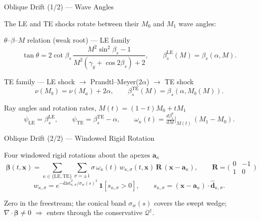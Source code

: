\documentclass[aspectratio=169]{beamer}
\newcommand{\xv}{\mathbf{x}}
\newcommand{\av}{\mathbf{a}}
\newcommand{\dhat}{\mathbf{\hat{d}}}
\newcommand{\R}{\mathbf{R}}
\newcommand{\dive}{\nabla\!\cdot}
\newcommand{\Qcal}{\mathcal{Q}}
\begin{document}
\begin{frame}{Oblique Drift (1/2) — Wave Angles}

The LE and TE shocks rotate between their $M_0$ and $M_1$ wave angles:

\begin{block}{$\theta$--$\beta$--$M$ relation (weak root) — LE family}
\[
    \tan\theta = 2\cot\beta_s\,\frac{M^2\sin^2\beta_s - 1}{M^2(\gamma_g+\cos2\beta_s)+2},
    \qquad
    \beta_s^{\mathrm{LE}}(M) = \beta_s(\alpha, M).
\]
\end{block}

\begin{block}{TE family — LE shock $\to$ Prandtl--Meyer($2\alpha$) $\to$ TE shock}
\[
    \nu(M_b) = \nu(M_a) + 2\alpha,
    \qquad
    \beta_s^{\mathrm{TE}}(M) = \beta_s(\alpha, M_b(M)).
\]
\end{block}

\begin{block}{Ray angles and rotation rates,\; $M(t)=(1-t)M_0+tM_1$}
\[
    \psi_{\mathrm{LE}} = \beta_s^{\mathrm{LE}}, \qquad
    \psi_{\mathrm{TE}} = \beta_s^{\mathrm{TE}}-\alpha, \qquad
    \omega_\kappa(t) = \tfrac{d\beta_s^{\kappa}}{dM}\big|_{M(t)}\,(M_1-M_0).
\]
\end{block}

\end{frame}
\begin{frame}{Oblique Drift (2/2) — Windowed Rigid Rotation}

\begin{block}{Four windowed rigid rotations about the apexes $\av_\kappa$}
\[
    \boxed{\;
    \boldsymbol{\beta}(t,\xv) = \sum_{\kappa\in\{\mathrm{LE},\mathrm{TE}\}}\sum_{\sigma=\pm1}
        \sigma\,\omega_\kappa(t)\,w_{\kappa,\sigma}(t,\xv)\,\R\,(\xv-\av_\kappa),
    \qquad
    \R = \bigl(\begin{smallmatrix}0&-1\\1&0\end{smallmatrix}\bigr)
    \;}
\]
\[
    w_{\kappa,\sigma} = e^{-\mathrm{dist}_{\kappa,\sigma}^2/\sigma_w(s)^2}\,
        \mathbf{1}[s_{\kappa,\sigma}>0],
    \qquad
    s_{\kappa,\sigma} = (\xv-\av_\kappa)\cdot\dhat_{\kappa,\sigma}.
\]
\end{block}

Zero in the freestream; the conical band $\sigma_w(s)$ covers the swept wedge;
$\dive\boldsymbol{\beta}\neq0$ $\Rightarrow$ enters through the conservative $\Qcal^{\dagger}$.

\end{frame}
\end{document}

